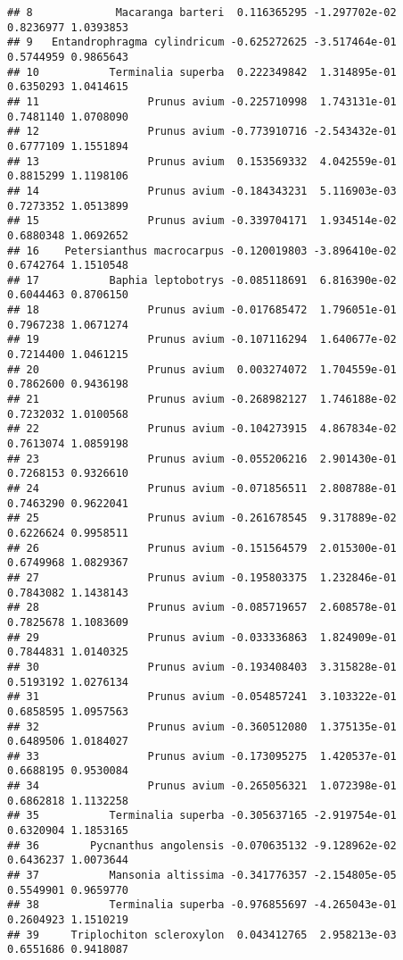 \documentclass[]{article}
\begin{document}
\begin{verbatim}
## 8             Macaranga barteri  0.116365295 -1.297702e-02 0.8236977 1.0393853
## 9   Entandrophragma cylindricum -0.625272625 -3.517464e-01 0.5744959 0.9865643
## 10           Terminalia superba  0.222349842  1.314895e-01 0.6350293 1.0414615
## 11                 Prunus avium -0.225710998  1.743131e-01 0.7481140 1.0708090
## 12                 Prunus avium -0.773910716 -2.543432e-01 0.6777109 1.1551894
## 13                 Prunus avium  0.153569332  4.042559e-01 0.8815299 1.1198106
## 14                 Prunus avium -0.184343231  5.116903e-03 0.7273352 1.0513899
## 15                 Prunus avium -0.339704171  1.934514e-02 0.6880348 1.0692652
## 16    Petersianthus macrocarpus -0.120019803 -3.896410e-02 0.6742764 1.1510548
## 17           Baphia leptobotrys -0.085118691  6.816390e-02 0.6044463 0.8706150
## 18                 Prunus avium -0.017685472  1.796051e-01 0.7967238 1.0671274
## 19                 Prunus avium -0.107116294  1.640677e-02 0.7214400 1.0461215
## 20                 Prunus avium  0.003274072  1.704559e-01 0.7862600 0.9436198
## 21                 Prunus avium -0.268982127  1.746188e-02 0.7232032 1.0100568
## 22                 Prunus avium -0.104273915  4.867834e-02 0.7613074 1.0859198
## 23                 Prunus avium -0.055206216  2.901430e-01 0.7268153 0.9326610
## 24                 Prunus avium -0.071856511  2.808788e-01 0.7463290 0.9622041
## 25                 Prunus avium -0.261678545  9.317889e-02 0.6226624 0.9958511
## 26                 Prunus avium -0.151564579  2.015300e-01 0.6749968 1.0829367
## 27                 Prunus avium -0.195803375  1.232846e-01 0.7843082 1.1438143
## 28                 Prunus avium -0.085719657  2.608578e-01 0.7825678 1.1083609
## 29                 Prunus avium -0.033336863  1.824909e-01 0.7844831 1.0140325
## 30                 Prunus avium -0.193408403  3.315828e-01 0.5193192 1.0276134
## 31                 Prunus avium -0.054857241  3.103322e-01 0.6858595 1.0957563
## 32                 Prunus avium -0.360512080  1.375135e-01 0.6489506 1.0184027
## 33                 Prunus avium -0.173095275  1.420537e-01 0.6688195 0.9530084
## 34                 Prunus avium -0.265056321  1.072398e-01 0.6862818 1.1132258
## 35           Terminalia superba -0.305637165 -2.919754e-01 0.6320904 1.1853165
## 36        Pycnanthus angolensis -0.070635132 -9.128962e-02 0.6436237 1.0073644
## 37           Mansonia altissima -0.341776357 -2.154805e-05 0.5549901 0.9659770
## 38           Terminalia superba -0.976855697 -4.265043e-01 0.2604923 1.1510219
## 39     Triplochiton scleroxylon  0.043412765  2.958213e-03 0.6551686 0.9418087

\end{verbatim}
\end{document}
